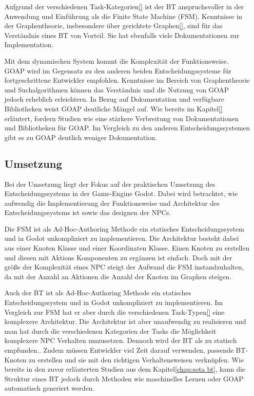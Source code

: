 Aufgrund der verschiedenen Task-Kategorien\ref{} ist der BT anspruchsvoller in der Anwendung und Einf\"{u}hrung als die Finite State Machine (FSM). Kenntnisse in der Graphentheorie, insbesondere \"{u}ber gerichtete Graphen\ref{}, sind f\"{u}r das Verst\"{a}ndnis eines BT von Vorteil. Sie hat ebenfalls viele Dokumentationen zur Implementation.

Mit dem dynamischen System kommt die Komplexit\"{a}t der Funktionsweise. GOAP wird im Gegensatz zu den anderen beiden Entscheidungssysteme f\"{u}r fortgeschrittene Entwickler empfohlen. Kenntnisse im Bereich von Graphentheorie und Suchalgorithmen k\"{o}nnen das Verst\"{a}ndnis und die Nutzung von GOAP jedoch erheblich erleichtern. In Bezug auf Dokumentation und verf\"{u}gbare Bibliotheken weist GOAP deutliche M\"{a}ngel auf. Wie bereits im Kapitel\ref{} erl\"{a}utert, fordern Studien wie \autocite{sielicki2018adaptation} eine st\"{a}rkere Verbreitung von Dokumentationen und Bibliotheken f\"{u}r GOAP. Im Vergleich zu den anderen Entscheidungssystemen gibt es zu GOAP deutlich weniger Dokumentation.


\subsection{Umsetzung}
\label{chap:umsetzung}

Bei der Umsetzung liegt der Fokus auf der praktischen Umsetzung des Entscheidungssystems in der Game-Engine Godot. Dabei wird betrachtet, wie aufwendig die Implementierung der Funktionsweise und Architektur des Entscheidungssystems ist sowie das designen der NPCs.

Die FSM ist als Ad-Hoc-Authoring Methode ein statisches Entscheidungssystem und in Godot unkompliziert zu implementieren. Die Architektur besteht dabei aus einer Knoten Klasse und einer Koordinaten Klasse. Einen Knoten zu erstellen und diesen mit Aktions Komponenten zu erg\"{a}nzen ist einfach. Doch mit der gr\"{o}\ss{}e der Komplexit\"{a}t eines NPC steigt der Aufwand die FSM instandzuhalten, da mit der Anzahl an Aktionen die Anzahl der Knoten im Graphen steigen.

Auch der BT ist als Ad-Hoc-Authoring Methode ein statisches Entscheidungssystem und in Godot unkompliziert zu implementieren. Im Vergleich zur FSM hat er aber durch die verschiedenen Task-Typen\ref{} eine komplexere Architektur. Die Architektur ist aber unaufwendig zu realisieren und man hat durch die verschiedenen Kategorien der Tasks die M\"{o}glichkeit komplexere NPC Verhalten umzusetzen. Dennoch wird der BT als zu statisch empfunden.\autocite{aiag}. Zudem m\"{u}ssen Entwickler viel Zeit darauf verwenden, passende BT-Knoten zu erstellen und sie mit den richtigen Verhaltensweisen verkn\"{u}pfen.\autocite{Schwab2021} Wie bereits in den zuvor erl\"{a}uterten Studien aus dem Kapitel\ref{chap:sota bt}, kann die Struktur eines BT jedoch durch Methoden wie maschinelles Lernen oder GOAP automatisch generiert werden.

